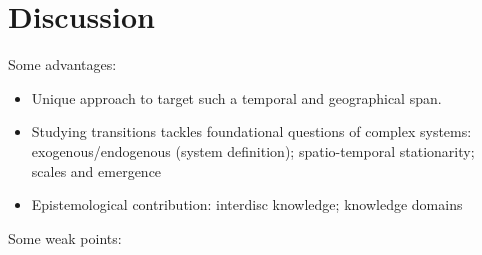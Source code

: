 \documentclass[11pt]{article}
\begin{document}





\section*{Discussion}






Some advantages:

\begin{itemize}
	\item Unique approach to target such a temporal and geographical span.
	\item Studying transitions tackles foundational questions of complex systems: exogenous/endogenous (system definition); spatio-temporal stationarity; scales and emergence
	\item Epistemological contribution: interdisc knowledge; knowledge domains
\end{itemize}


Some weak points: 
\end{document}
